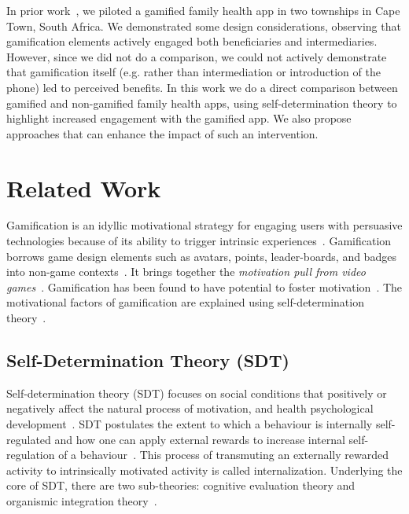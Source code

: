 \documentclass{sig-alternate}
\begin{document}
In prior work~\cite{katule2016:leveraging}, we piloted a gamified family health app in two townships in Cape Town, South Africa. We demonstrated some design considerations, observing that gamification elements actively engaged both beneficiaries and intermediaries.  However, since we did not do a comparison, we could not actively demonstrate that gamification itself (e.g. rather than intermediation or introduction of the phone) led to perceived benefits. In this work we do a direct comparison between gamified and non-gamified family health apps, using self-determination theory to highlight increased engagement with the gamified app.
We also propose approaches that can enhance the impact of such an intervention. 

\section{Related Work} 
Gamification is an idyllic motivational strategy for engaging users with persuasive technologies because of its ability to trigger intrinsic experiences~\cite{hamari2014persuasive}. Gamification borrows game design elements such as avatars, points, leader-boards, and badges into non-game contexts~\cite{deterding2011game}. It brings together the \emph{motivation pull from video games}~\cite{ryan2006:motivationalpull}. Gamification has been found to have potential to foster motivation~\cite{sailer2013:psychological}. The motivational  factors of gamification are explained using self-determination theory~\cite{deci1985:intrinsic}.    

\subsection{Self-Determination Theory (SDT)}
Self-determination theory (SDT) focuses on social conditions that positively or negatively affect the natural process of motivation, and health psychological development~\cite{ryan2000:self}. SDT postulates the extent to which a behaviour is internally self-regulated and how one can apply external rewards to increase internal self-regulation of a behaviour~\cite{ryan2000:self}. This process of transmuting an externally rewarded activity to intrinsically motivated activity is called internalization. Underlying the core of SDT, there are two sub-theories: cognitive evaluation theory and organismic integration theory~\cite{ryan2000:self}. 
\end{document}
